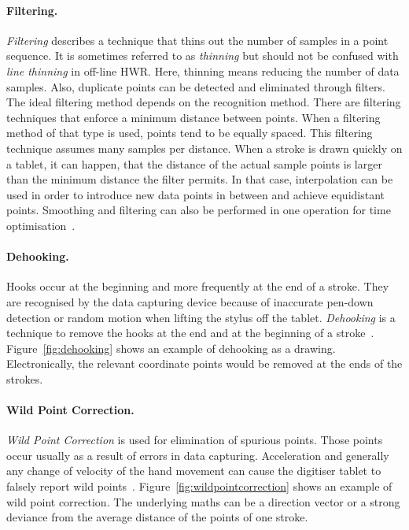 \paragraph{Filtering.}
\label{sec:filtering}
\emph{Filtering} describes a technique that thins out the number of samples in 
a point sequence. It is sometimes referred to as \emph{thinning} but should not 
be confused with \emph{line thinning} in off-line HWR. Here, thinning means 
reducing the number of data samples. Also, duplicate points can be detected
and eliminated through filters.
The ideal filtering method depends on the recognition method. There are 
filtering techniques that enforce a minimum distance between points. When a 
filtering method of that type is used, points tend to be equally spaced.
This filtering technique assumes many samples per distance. When a stroke is 
drawn quickly on a tablet, it can happen, that the distance of the actual sample 
points is larger than the minimum distance the filter permits. In that case,
interpolation can be used in order to introduce new data points in between and
achieve equidistant points. Smoothing and filtering can also be performed in one 
operation for time optimisation~.

\paragraph{Dehooking.}
\label{sec:dehooking}
Hooks occur at the beginning and more frequently at the end of a stroke. They
are recognised by the data capturing device because of inaccurate pen-down 
detection or random motion when lifting the stylus off the tablet.
\emph{Dehooking} is a technique to remove the hooks at the end and at the 
beginning of a stroke~. Figure~\ref{fig:dehooking} shows
an example of dehooking as a drawing. Electronically, the relevant coordinate
points would be removed at the ends of the strokes.

\paragraph{Wild Point Correction.}
\label{sec:wildpointcorrection}
\emph{Wild Point Correction} is used for elimination of spurious points. Those 
points occur usually as a result of errors in data capturing. Acceleration and 
generally any change of velocity of the hand movement can cause the digitiser 
tablet to falsely report wild points~.
Figure~\ref{fig:wildpointcorrection} shows an example of wild point correction.
The underlying maths can be a direction vector or a strong deviance from the
average distance of the points of one stroke.


